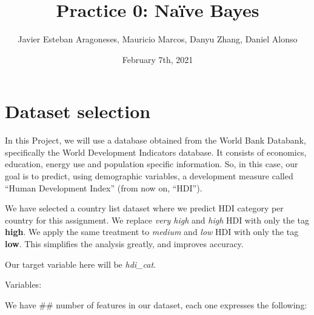 \documentclass[]{article}
\title{Practice 0: Naïve Bayes}
\author{Javier Esteban Aragoneses, Mauricio Marcos, Danyu Zhang, Daniel Alonso}
\date{February 7th, 2021}
\begin{document}
\maketitle

\hypertarget{dataset-selection}{%
\section{Dataset selection}\label{dataset-selection}}

In this Project, we will use a database obtained from the World Bank
Databank, specifically the World Development Indicators database. It
consists of economics, education, energy use and population specific
information. So, in this case, our goal is to predict, using demographic
variables, a development measure called ``Human Development Index''
(from now on, ``HDI'').

We have selected a country list dataset where we predict HDI category
per country for this assignment. We replace \emph{very high} and
\emph{high} HDI with only the tag \textbf{high}. We apply the same
treatment to \emph{medium} and \emph{low} HDI with only the tag
\textbf{low}. This simplifies the analysis greatly, and improves
accuracy.

Our target variable here will be \emph{hdi\_cat}.

Variables:

We have \#\# number of features in our dataset, each one expresses the
following:
\end{document}
